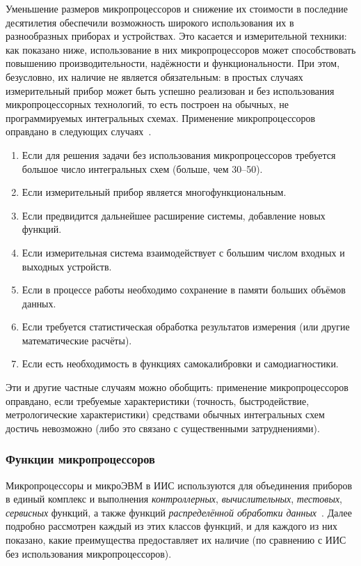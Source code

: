 \documentclass[a4paper, 14pt, titlepage]{extarticle}
\newcommand{\term}[1]{\emph{#1}}
\begin{document}
  Уменьшение размеров микропроцессоров и снижение их стоимости в последние десятилетия обеспечили
  возможность широкого использования их в разнообразных приборах и устройствах. Это касается и
  измерительной техники: как показано ниже, использование в них микропроцессоров может
  способствовать повышению производительности, надёжности и функциональности. При этом, безусловно,
  их наличие не является обязательным: в простых случаях измерительный прибор может быть успешно реализован
  и без использования микропроцессорных технологий, то есть построен на обычных, не программируемых
  интегральных схемах. Применение микропроцессоров оправдано в следующих случаях~\cite[с.~241]{rannev-meas-tech}.
  \begin{enumerate}
    \item Если для решения задачи без использования микропроцессоров требуется большое число интегральных
      схем (больше, чем 30--50).
    \item Если измерительный прибор является многофункциональным.
    \item Если предвидится дальнейшее расширение системы, добавление новых функций.
    \item Если измерительная система взаимодействует с большим числом входных и выходных устройств.
    \item Если в процессе работы необходимо сохранение в памяти больших объёмов данных.
    \item Если требуется статистическая обработка результатов измерения (или другие математические расчёты).
    \item Если есть необходимость в функциях самокалибровки и самодиагностики.
  \end{enumerate}
  Эти и другие частные случаям можно обобщить: применение микропроцессоров оправдано, если требуемые
  характеристики (точность, быстродействие, метрологические характеристики) средствами обычных
  интегральных схем достичь невозможно (либо это связано с существенными затруднениями).

  \subsubsection{Функции микропроцессоров}\label{sssec:mcu-functions}

  Микропроцессоры и микроЭВМ в ИИС используются для объединения приборов в единый комплекс и выполнения
  \term{контроллерных}, \term{вычислительных}, \term{тестовых}, \term{сервисных} функций, а также
  функций \term{распределённой обработки данных}~\cite[с.~421]{rannev-meas-tech}.
  Далее подробно рассмотрен каждый из этих классов функций, и для каждого из них показано, какие
  преимущества предоставляет их наличие (по сравнению с ИИС без использования микропроцессоров).
\end{document}
